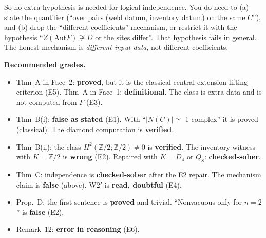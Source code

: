 \documentclass[11pt]{article}
\newcommand{\Z}{\mathbb{Z}}
\begin{document}
So no extra hypothesis is needed for logical independence. You do need to (a) state the quantifier
(``over pairs (weld datum, inventory datum) on the same $C$''), and (b) drop the ``different
coefficients'' mechanism, or restrict it with the hypothesis ``$Z(\mathrm{Aut}F)\not\cong D$ or
the sites differ''. That hypothesis fails in general. The honest mechanism is \emph{different
input data}, not different coefficients.

\textbf{Recommended grades.}
\begin{itemize}[leftmargin=1.2em]
\item Thm~A in Face~2: \textbf{proved}, but it is the classical central-extension lifting criterion
(E5). Thm~A in Face~1: \textbf{definitional}. The class is extra data and is not computed from $F$
(E3).
\item Thm~B(i): \textbf{false as stated} (E1). With ``$|N(C)|\simeq$ 1-complex'' it is proved
(classical). The diamond computation is \textbf{verified}.
\item Thm~B(ii): the class $H^2(\Z/2;\Z/2)\neq0$ is \textbf{verified}. The inventory witness with
$K=\Z/2$ is \textbf{wrong} (E2). Repaired with $K=D_4$ or $Q_8$: \textbf{checked-sober}.
\item Thm~C: independence is \textbf{checked-sober} after the E2 repair. The mechanism claim is
\textbf{false} (above). W2$'$ is \textbf{read, doubtful} (E4).
\item Prop.~D: the first sentence is \textbf{proved} and trivial. ``Nonvacuous only for $n=2$'' is
\textbf{false} (E2).
\item Remark~12: \textbf{error in reasoning} (E6).
\end{itemize}
\end{document}

